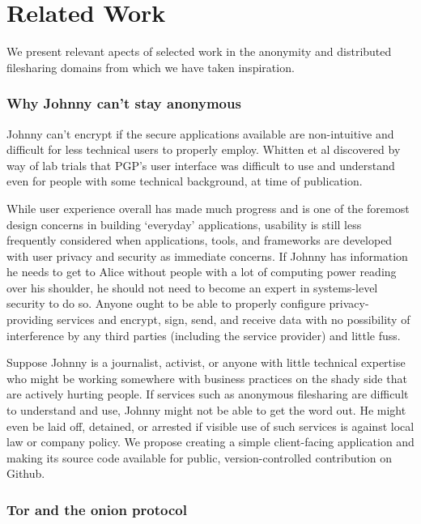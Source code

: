 \section{Related Work}

We present relevant apects of selected work in the anonymity and
distributed filesharing domains from which we have taken inspiration.

\subsubsection*{Why Johnny can't stay anonymous}

Johnny can't encrypt if the secure applications available are non-intuitive and difficult for
less technical users to properly employ. Whitten et al discovered by way of lab trials that PGP's
user interface was difficult to use and understand even for people with some technical background,
at time of publication.

While user experience overall has made much progress and is one of the foremost design
concerns in building `everyday' applications, usability is still less frequently considered when applications,
tools, and frameworks are developed with user privacy and security as immediate concerns. If Johnny has information he needs
to get to Alice without people with a lot of computing power reading over
his shoulder, he should not need to become an expert in systems-level security to do so. Anyone ought to be able to properly configure
privacy-providing services and encrypt, sign, send, and receive data with no possibility of interference
by any third parties (including the service provider) and little fuss.

Suppose Johnny is a journalist, activist, or anyone with little technical expertise who might be working
somewhere with business practices on the shady side that are actively hurting people.
If services such as anonymous filesharing are difficult to understand and use, Johnny might not be able to get the
word out. He might even be laid off, detained, or arrested if visible use of such
services is against local law or company policy. We
propose creating a simple client-facing application and making
its source code available for public, version-controlled
contribution on Github.

\subsubsection*{Tor and the onion protocol}

